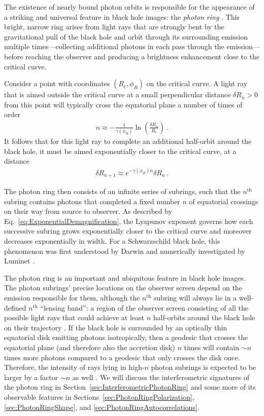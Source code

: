 \documentclass[graybox,envcountchap]{svmult}
\newcommand{\pa}[1]{\left(#1\right)}
\begin{document}
The existence of nearly bound photon orbits is responsible for the appearance of a striking and universal feature in black hole images: the \emph{photon ring} \cite{Beckwith2005,Gralla2019,JohnsonLupsasca2020}.
This bright, narrow ring arises from light rays that are strongly bent by the gravitational pull of the black hole and orbit through its surrounding emission multiple times---collecting additional photons in each pass through the emission---before reaching the observer and producing a brightness enhancement close to the critical curve.

Consider a point with coordinates $(R_c,\phi_R)$ on the critical curve.
A light ray that is aimed outside the critical curve at a small perpendicular distance $\delta R_n>0$  from this point will typically cross the equatorial plane a number of times of order \cite{JohnsonLupsasca2020}
\begin{align}
    n\approx-\frac{1}{\gamma(\phi_R)}\ln\pa{\frac{\delta R_n}{R_c}}\,.
\end{align}
It follows that for this light ray to complete an additional half-orbit around the black hole, it must be aimed exponentially closer to the critical curve, at a distance
\begin{align}
    \label{eq:ExponentialDemagnification}
    \delta R_{n+1}\approx e^{-\gamma(\phi_R)n}\delta R_n\,.
\end{align}

The photon ring then consists of an infinite series of subrings, such that the $n^\text{th}$ subring contains photons that completed a fixed number $n$ of equatorial crossings on their way from source to observer.
As described by Eq.~\eqref{eq:ExponentialDemagnification}, the Lyapunov exponent governs how each successive subring grows exponentially closer to the critical curve and moreover decreases exponentially in width.
For a Schwarzschild black hole, this phenomenon was first understood by Darwin \cite{Darwin1959} and numerically investigated by Luminet \cite{Luminet1979}.

The photon ring is an important and ubiquitous feature in black hole images.
The photon subrings' precise locations on the observer screen depend on the emission responsible for them, although the $n^\text{th}$ subring will always lie in a well-defined $n^\text{th}$ ``lensing band'': a region of the observer screen consisting of all the possible light rays that could achieve at least $n$ half-orbits around the black hole on their trajectory \cite{Paugnat2022,CardenasAvendano2023}.
If the black hole is surrounded by an optically thin equatorial disk emitting photons isotropically, then a geodesic that crosses the equatorial plane (and therefore also the accretion disk) $n$ times will contain $\sim n$ times more photons compared to a geodesic that only crosses the disk once.
Therefore, the intensity of rays lying in high-$n$ photon subrings is expected to be larger by a factor $\sim n$ as well \cite{Gralla2019,JohnsonLupsasca2020}.
We will discuss the interferometric signatures of the photon ring in Section~\ref{sec:InterferometricPhotonRing} and some more of its observable features in Sections~\ref{sec:PhotonRingPolarization}, \ref{sec:PhotonRingShape}, and \ref{sec:PhotonRingAutocorrelations}.
\end{document}
